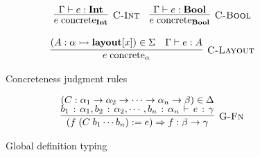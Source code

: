 \begin{figure}[b]
\centering
\begin{minipage}{1.0\linewidth}
{\footnotesize{
\[
  \begin{array}{c}
    \labinfer[C-Int]{e \concrete{\Int}}
      {\Gamma \vdash e : \Int}
    ~~~
    \labinfer[C-Bool]{e \concrete{\Bool}}
      {\Gamma \vdash e : \Bool}
    \\\\
    \labinfer[C-Layout]{e \concrete{\alpha}}
      {(A : \alpha \monic \layout[x]) \in \Sigma &
       \Gamma \vdash e : A
      }
  \end{array}
\]
}}
\end{minipage}
  \caption{Concreteness judgment rules}
  \label{fig:concreteness-rules}
\begin{minipage}{1.0\linewidth}
{\footnotesize{
\[
\begin{array}{c}
  \labinfer[G-Fn]{(f\; (C\; b_1 \cdots b_n) := e) \Rightarrow f : \beta \rightarrow \gamma}
    {(C : \alpha_1 \rightarrow \alpha_2 \rightarrow \cdots \rightarrow \alpha_n \rightarrow \beta) \in \Delta\\
    b_1 : \alpha_1, b_2 : \alpha_2, \cdots, b_n : \alpha_n \vdash e : \gamma
    }
\end{array}
\]
}}
\end{minipage}
  \caption{Global definition typing}
  \label{fig:globals-typing-rules}
\end{figure}

